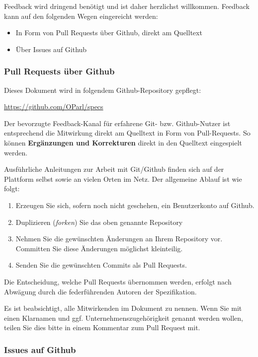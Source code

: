 \documentclass[,a4paper]{article}
\begin{document}
Feedback wird dringend benötigt und ist daher herzlichst willkommen.
Feedback kann auf den folgenden Wegen eingereicht werden:

\begin{itemize}
\item
  In Form von Pull Requests über Github, direkt am Quelltext
\item
  Über Issues auf Github
\end{itemize}

\subsubsection{Pull Requests über Github}

Dieses Dokument wird in folgendem Github-Repository gepflegt:

\href{https://github.com/OParl/specs}{https://github.com/OParl/specs}

Der bevorzugte Feedback-Kanal für erfahrene Git- bzw. Github-Nutzer ist
entsprechend die Mitwirkung direkt am Quelltext in Form von
Pull-Requests. So können \textbf{Ergänzungen und Korrekturen} direkt in
den Quelltext eingespielt werden.

Ausführliche Anleitungen zur Arbeit mit Git/Github finden sich auf der
Plattform selbst sowie an vielen Orten im Netz. Der allgemeine Ablauf
ist wie folgt:

\begin{enumerate}[1.]
\item
  Erzeugen Sie sich, sofern noch nicht geschehen, ein Benutzerkonto auf
  Github.
\item
  Duplizieren (\emph{forken}) Sie das oben genannte Repository
\item
  Nehmen Sie die gewünschten Änderungen an Ihrem Repository vor.
  Committen Sie diese Änderungen möglichst kleinteilig.
\item
  Senden Sie die gewünschten Commits als Pull Requests.
\end{enumerate}

Die Entscheidung, welche Pull Requests übernommen werden, erfolgt nach
Abwägung durch die federführenden Autoren der Spezifikation.

Es ist beabsichtigt, alle Mitwirkenden im Dokument zu nennen. Wenn Sie
mit einen Klarnamen und ggf. Unternehmenszugehörigkeit genannt werden
wollen, teilen Sie dies bitte in einem Kommentar zum Pull Request mit.

\subsubsection{Issues auf Github}
\end{document}
